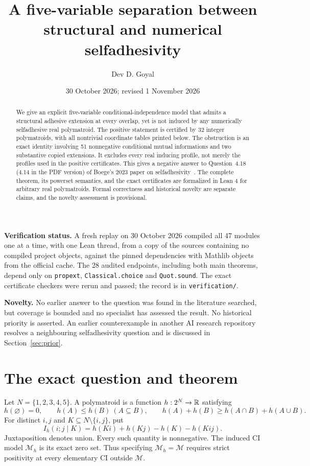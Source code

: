 \documentclass[11pt]{article}
\title{A five-variable separation between structural and numerical selfadhesivity}
\author{Dev D. Goyal}
\date{30 October 2026; revised 1 November 2026}
\newcommand{\M}{\mathcal M}\newcommand{\st}{\mathfrak{st}}
\begin{document}
\maketitle
\begin{abstract}
We give an explicit five-variable conditional-independence model that admits a
structural adhesive extension at every overlap, yet is not induced by any
numerically selfadhesive real polymatroid. The positive statement is certified by
32 integer polymatroids, with all nontrivial coordinate tables printed below.
The obstruction is an exact identity involving 51 nonnegative conditional mutual
informations and two substantive copied extensions. It excludes every real
inducing profile, not merely the profiles used in the positive certificates.
This gives a negative answer to Question~4.18 (4.14 in the PDF version) of Boege's 2023 paper on
selfadhesivity~\cite{Boege}. The complete theorem, its powerset semantics, and
the exact certificates are formalized in Lean 4 for arbitrary real
polymatroids. Formal correctness and
historical novelty are separate claims, and the novelty assessment is
provisional.
\end{abstract}
\textbf{Verification status.} A fresh replay on 30 October 2026 compiled all 47 modules one at a time, with one Lean thread, from a copy of the sources containing no compiled project objects, against the pinned dependencies with Mathlib objects from the official cache. The 28 audited endpoints, including both main theorems, depend only on \texttt{propext}, \texttt{Classical.choice} and \texttt{Quot.sound}. The exact certificate checkers were rerun and passed; the record is in \texttt{verification/}.

\textbf{Novelty.} No earlier answer to the question was found in the literature
searched, but coverage is bounded and no specialist has assessed the result. No
historical priority is asserted. An earlier counterexample in another AI
research repository resolves a neighbouring selfadhesivity question and is
discussed in Section~\ref{sec:prior}.

\section{The exact question and theorem}
Let $N=\{1,2,3,4,5\}$. A polymatroid is a function $h:2^N\to\mathbb R$ satisfying
\[
h(\varnothing)=0,\qquad h(A)\le h(B)\ (A\subseteq B),\qquad
h(A)+h(B)\ge h(A\cap B)+h(A\cup B).
\]
For distinct $i,j$ and $K\subseteq N\setminus\{i,j\}$, put
\[
 I_h(i;j\mid K)=h(Ki)+h(Kj)-h(K)-h(Kij).
\]
Juxtaposition denotes union. Every such quantity is nonnegative. The induced
CI model $\M_h$ is its exact zero set. Thus specifying $\M_h=\M$ requires
strict positivity at every elementary CI outside $\M$.
\end{document}
